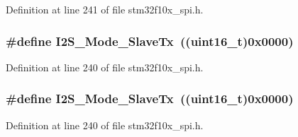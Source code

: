 Definition at line 241 of file stm32f10x\+\_\+spi.\+h.

\subsubsection[{\texorpdfstring{I2\+S\+\_\+\+Mode\+\_\+\+Slave\+Tx}{I2S_Mode_SlaveTx}}]{\setlength{\rightskip}{0pt plus 5cm}\#define I2\+S\+\_\+\+Mode\+\_\+\+Slave\+Tx~(({\bf uint16\+\_\+t})0x0000)}\hypertarget{group___i2_s___mode_gadd5b20277198fcdb6aa53ea48e802ae5}{}\label{group___i2_s___mode_gadd5b20277198fcdb6aa53ea48e802ae5}


Definition at line 240 of file stm32f10x\+\_\+spi.\+h.

\subsubsection[{\texorpdfstring{I2\+S\+\_\+\+Mode\+\_\+\+Slave\+Tx}{I2S_Mode_SlaveTx}}]{\setlength{\rightskip}{0pt plus 5cm}\#define I2\+S\+\_\+\+Mode\+\_\+\+Slave\+Tx~(({\bf uint16\+\_\+t})0x0000)}\hypertarget{group___i2_s___mode_gadd5b20277198fcdb6aa53ea48e802ae5}{}\label{group___i2_s___mode_gadd5b20277198fcdb6aa53ea48e802ae5}


Definition at line 240 of file stm32f10x\+\_\+spi.\+h.

